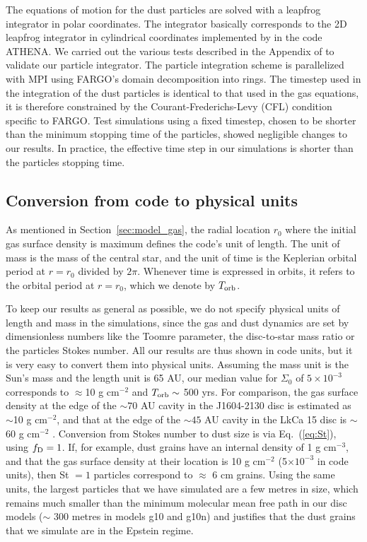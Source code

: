 \documentclass[a4paper,usenatbib]{mnras}
\begin{document}
The equations of motion for the dust particles are solved with a
leapfrog integrator in polar coordinates. The integrator basically
corresponds to the 2D leapfrog integrator in cylindrical coordinates
implemented by \cite{Zhu14} in the code ATHENA. We carried out the
various tests described in the Appendix of \cite{Zhu14} to validate
our particle integrator. The particle integration scheme is
parallelized with MPI using FARGO's domain decomposition into rings.
The timestep used in the integration of the dust particles is
identical to that used in the gas equations, it is therefore
constrained by the Courant-Frederichs-Levy (CFL) condition specific to
FARGO. Test simulations using a fixed timestep, chosen to be shorter
than the minimum stopping time of the particles, showed negligible
changes to our results. In practice, the effective time step in our
simulations is shorter than the particles stopping time.


\subsection{Conversion from code to physical units}
\label{sec:codeunits}
As mentioned in Section~\ref{sec:model_gas}, the radial location $r_0$
where the initial gas surface density is maximum defines the code's
unit of length. The unit of mass is the mass of the central star, and
the unit of time is the Keplerian orbital period at $r=r_0$ divided by
$2\pi$. Whenever time is expressed in orbits, it refers to the orbital
period at $r=r_0$, which we denote by $T_{\rm orb}$.

To keep our results as general as possible, we do not specify physical
units of length and mass in the simulations, since the gas and dust
dynamics are set by dimensionless numbers like the Toomre parameter,
the disc-to-star mass ratio or the particles Stokes number. All our
results are thus shown in code units, but it is very easy to convert
them into physical units. Assuming the mass unit is the Sun's mass and
the length unit is 65 AU, our median value for $\Sigma_0$ of $5\times
10^{-3}$ corresponds to $\approx$10 g cm$^{-2}$ and $T_{\rm orb}\sim$
500 yrs.  For comparison, the gas surface density at the edge of the
$\sim$$70$ AU cavity in the J1604-2130 disc is estimated as $\sim$10 g
cm$^{-2}$, and that at the edge of the $\sim$$45$ AU cavity in the
LkCa 15 disc is $\sim$60 g cm$^{-2}$ \citep{vanderMarel2015}.
Conversion from Stokes number to dust size is via Eq.~(\ref{eq:St}),
using $f_{\rm D} = 1$. If, for example, dust grains have an internal
density of 1 g cm$^{-3}$, and that the gas surface density at their
location is 10 g cm$^{-2}$ (5$\times 10^{-3}$ in code units), then St
$=1$ particles correspond to $\approx$ 6 cm grains. Using the same
units, the largest particles that we have simulated are a few metres
in size, which remains much smaller than the minimum molecular mean
free path in our disc models ($\sim$ 300 metres in models g10 and
g10n) and justifies that the dust grains that we simulate are in the
Epstein regime.
\end{document}
